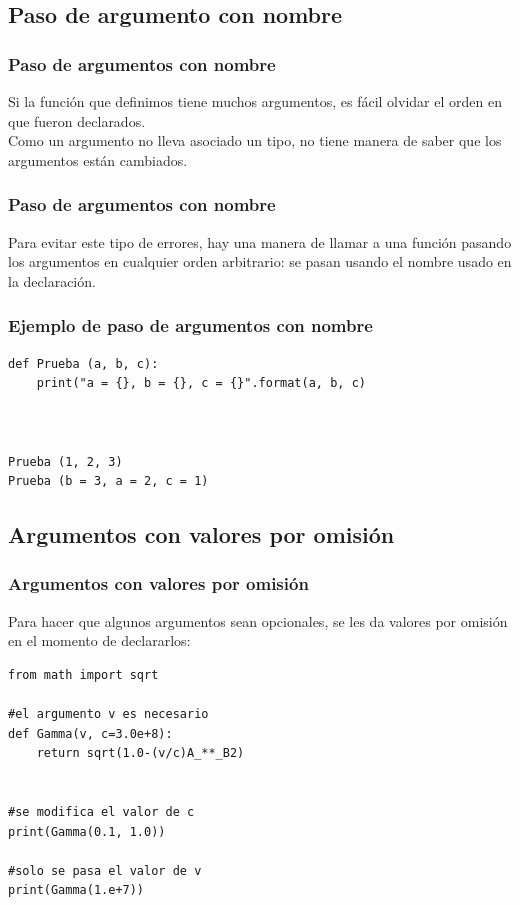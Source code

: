 \subsection{Paso de argumento con nombre}
\begin{frame}
\frametitle{Paso de argumentos con nombre}
Si la función que definimos tiene muchos argumentos, es fácil olvidar el orden en que fueron declarados.
\\
\medskip
Como un argumento no lleva asociado un tipo, \python{} no tiene manera de saber que los argumentos están cambiados.
\end{frame}
\begin{frame}
\frametitle{Paso de argumentos con nombre}
Para evitar este tipo de errores, hay una manera de llamar a una función pasando los argumentos en cualquier orden arbitrario: se pasan usando el nombre usado en la declaración.
\end{frame}
\begin{frame}[fragile]
\frametitle{Ejemplo de paso de argumentos con nombre}
\begin{lstlisting}[style=codigopython]
def Prueba (a, b, c):
    print("a = {}, b = {}, c = {}".format(a, b, c)



Prueba (1, 2, 3)
Prueba (b = 3, a = 2, c = 1)
\end{lstlisting}
\end{frame}
\subsection{Argumentos con valores por omisión}
\begin{frame}
\frametitle{Argumentos con valores por omisión}
Para hacer que algunos argumentos sean opcionales, se les da valores por omisión en el momento de declararlos:
\begin{lstlisting}[style=codigopython]
from math import sqrt

#el argumento v es necesario
def Gamma(v, c=3.0e+8):
    return sqrt(1.0-(v/c)A_**_B2)


#se modifica el valor de c
print(Gamma(0.1, 1.0))

#solo se pasa el valor de v
print(Gamma(1.e+7))
\end{lstlisting}
\end{frame}
